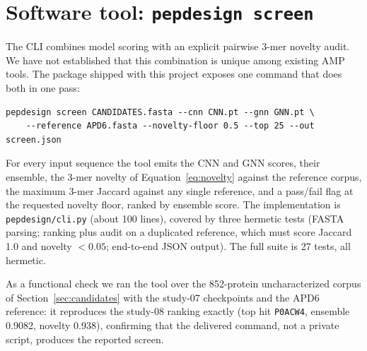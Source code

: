 \section{Software tool: \texttt{pepdesign screen}}
\label{sec:tool}

The CLI combines model scoring with an explicit pairwise 3-mer novelty
audit. We have not established that this combination is unique among
existing AMP tools. The package shipped with
this project exposes one command that does both in one pass:

\begin{verbatim}
pepdesign screen CANDIDATES.fasta --cnn CNN.pt --gnn GNN.pt \
    --reference APD6.fasta --novelty-floor 0.5 --top 25 --out screen.json
\end{verbatim}

For every input sequence the tool emits the CNN and GNN scores, their
ensemble, the 3-mer novelty of Equation~\eqref{eq:novelty} against the
reference corpus, the maximum 3-mer Jaccard against any single reference,
and a pass/fail flag at the requested novelty floor, ranked by ensemble
score. The implementation is \texttt{pepdesign/cli.py} (about 100 lines), covered
by three hermetic tests (FASTA parsing; ranking plus audit on a duplicated
reference, which must score Jaccard 1.0 and novelty $<0.05$; end-to-end
JSON output). The full suite is 27 tests, all hermetic.

As a functional check we ran the tool over the 852-protein uncharacterized
corpus of Section~\ref{sec:candidates} with the study-07 checkpoints and
the APD6 reference: it reproduces the study-08 ranking exactly (top hit
\texttt{P0ACW4}, ensemble 0.9082, novelty 0.938), confirming that the
delivered command, not a private script, produces the reported screen.
